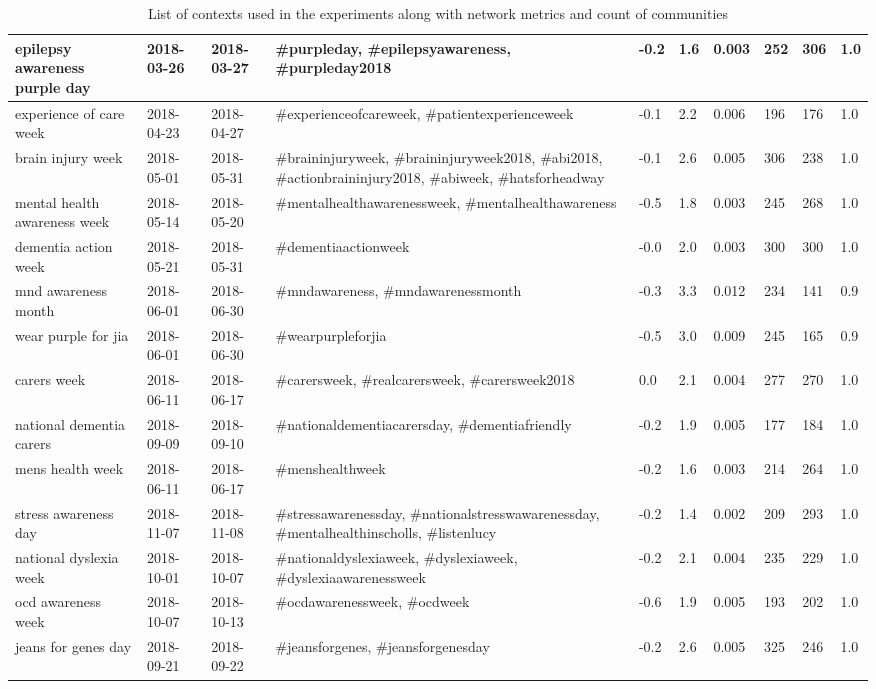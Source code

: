 \documentclass[runningheads]{llncs}
\begin{document}
\begin{table}
{\begin{tabularx}{\textwidth}{|X|X|X|X|X|Y|Y|Y|Y|Y|}
            epilepsy awareness purple day & 2018-03-26 & 2018-03-27 & \#purpleday, \#epilepsyawareness, \#purpleday2018 & -0.2 & 1.6 & 0.003 & 252 & 306 & 1.0 \\ \hline
            experience of care week & 2018-04-23 & 2018-04-27 & \#experienceofcareweek, \#patientexperienceweek & -0.1 & 2.2 & 0.006 & 196 & 176 & 1.0 \\ \hline
            brain injury week & 2018-05-01 & 2018-05-31 & \#braininjuryweek, \#braininjuryweek2018, \#abi2018, \#actionbraininjury2018, \#abiweek, \#hatsforheadway & -0.1 & 2.6 & 0.005 & 306 & 238 & 1.0 \\ \hline
            mental health awareness week & 2018-05-14 & 2018-05-20 & \#mentalhealthawarenessweek, \#mentalhealthawareness & -0.5 & 1.8 & 0.003 & 245 & 268 & 1.0 \\ \hline
            dementia action week & 2018-05-21 & 2018-05-31 & \#dementiaactionweek & -0.0 & 2.0 & 0.003 & 300 & 300 & 1.0 \\ \hline
            mnd awareness month & 2018-06-01 & 2018-06-30 & \#mndawareness, \#mndawarenessmonth & -0.3 & 3.3 & 0.012 & 234 & 141 & 0.9 \\ \hline
            wear purple for jia & 2018-06-01 & 2018-06-30 & \#wearpurpleforjia & -0.5 & 3.0 & 0.009 & 245 & 165 & 0.9 \\ \hline
            carers week & 2018-06-11 & 2018-06-17 & \#carersweek, \#realcarersweek, \#carersweek2018 & 0.0 & 2.1 & 0.004 & 277 & 270 & 1.0 \\ \hline
            national dementia carers & 2018-09-09 & 2018-09-10 & \#nationaldementiacarersday, \#dementiafriendly & -0.2 & 1.9 & 0.005 & 177 & 184 & 1.0 \\ \hline
            mens health week & 2018-06-11 & 2018-06-17 & \#menshealthweek & -0.2 & 1.6 & 0.003 & 214 & 264 & 1.0 \\ \hline
            stress awareness day & 2018-11-07 & 2018-11-08 & \#stressawarenessday, \#nationalstresswawarenessday, \#mentalhealthinscholls, \#listenlucy & -0.2 & 1.4 & 0.002 & 209 & 293 & 1.0 \\ \hline
            national dyslexia week & 2018-10-01 & 2018-10-07 & \#nationaldyslexiaweek, \#dyslexiaweek, \#dyslexiaawarenessweek & -0.2 & 2.1 & 0.004 & 235 & 229 & 1.0 \\ \hline
            ocd awareness week & 2018-10-07 & 2018-10-13 & \#ocdawarenessweek, \#ocdweek & -0.6 & 1.9 & 0.005 & 193 & 202 & 1.0 \\ \hline
            jeans for genes day & 2018-09-21 & 2018-09-22 & \#jeansforgenes, \#jeansforgenesday & -0.2 & 2.6 & 0.005 & 325 & 246 & 1.0 \\ \hline
        \end{tabularx}
	}
	
	\caption{List of contexts used in the experiments along with network metrics and count of \demon communities}
	\label{tab:contexts}
\end{table}	 
\end{document}
